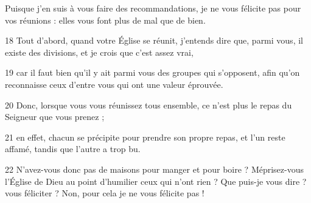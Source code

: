 Puisque j’en suis à vous faire des recommandations, je ne vous félicite pas pour vos réunions : elles vous font plus de mal que de bien.

18 Tout d’abord, quand votre Église se réunit, j’entends dire que, parmi vous, il existe des divisions, et je crois que c’est assez vrai,

19 car il faut bien qu’il y ait parmi vous des groupes qui s’opposent, afin qu’on reconnaisse ceux d’entre vous qui ont une valeur éprouvée.

20 Donc, lorsque vous vous réunissez tous ensemble, ce n’est plus le repas du Seigneur que vous prenez ;

21 en effet, chacun se précipite pour prendre son propre repas, et l’un reste affamé, tandis que l’autre a trop bu.

22 N’avez-vous donc pas de maisons pour manger et pour boire ? Méprisez-vous l’Église de Dieu au point d’humilier ceux qui n’ont rien ? Que puis-je vous dire ? vous féliciter ? Non, pour cela je ne vous félicite pas !